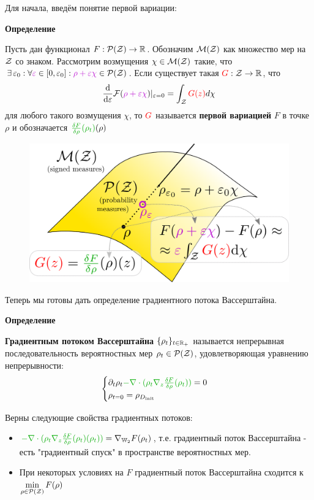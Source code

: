 Для начала, введём понятие первой вариации:

\textbf{Определение}

Пусть дан функционал $F : \mathcal{P}(\mathcal{Z}) \rightarrow \mathbb{R}$. Обозначим $\mathcal{M}(\mathcal{Z})$ как множество мер на $\mathcal{Z}$ со знаком. Рассмотрим возмущения $\chi \in \mathcal{M}(\mathcal{Z})$ такие, что $\exists \, \varepsilon_0 : \forall \fiol{\varepsilon} \in [0, \varepsilon_0]: \fiol{\rho + \varepsilon \chi} \in \cP(\cZ)$. Если существует такая ${\color{red} G}: \mathcal{Z} \rightarrow \mathbb{R}$, что 
\vspace{-3mm}
\begin{gather*}
    \frac{\dd}{\dd \varepsilon}\cF(\fiol{\rho + \varepsilon \chi})|_{\varepsilon = 0} = \int_{\cZ} \red{G(z)} d \chi
\end{gather*}
для любого такого возмущения $\chi$, то ${\color{red} G}$ называется \textbf{первой вариацией} $F$ в точке $\rho$ и обозначается $\green{\fdv{F}{\rho}(\rho_t)}(\rho)$

\begin{figure}[h]
    \centering
    \includegraphics[width=0.5\linewidth]{chapters/petr_mokrov_s2/figs/fv_explanation.png}
\end{figure}

Теперь мы готовы дать определение градиентного потока Вассерштайна. 

\textbf{Определение}

\textbf{Градиентным потоком Вассерштайна} $\{ \rho_t \}_{t \in \mathbb{R}_+}$ называется непрерывная последовательность вероятностных мер $\rho_t \in \mathcal{P}(\mathcal{Z})$, удовлетворяющая уравнению непрерывности: 
\begin{gather*}
\begin{cases}
    \partial_t \rho_t \green{- \divg{(\rho_t \nabla_{z} \fdv{F}{\rho}(\rho_t))}} = 0 \\
    \rho_{t = 0} = \rho_{D_{\ini}}
\end{cases}  
\end{gather*}

Верны следующие свойства градиентных потоков: 

\begin{itemize}
    \item $\green{ - \divg{(\rho_t \nabla_{z} \fdv{F}{\rho}(\rho_t)(\rho_t))}} = \nabla_{\bbW_2} F(\rho_t)$, т.е. градиентный поток Вассерштайна - есть "градиентный спуск" в пространстве вероятностных мер.
    \item При некоторых условиях на $F$ градиентный поток Вассерштайна сходится к $\min\limits_{\rho \in \mathcal{P}(\mathcal{Z})} F(\rho)$
\end{itemize}

